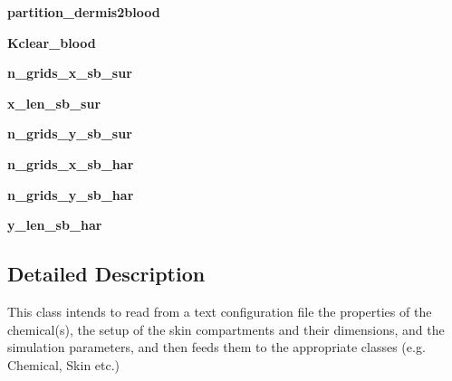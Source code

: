 \begin{DoxyCompactItemize}
\item 
{\bfseries partition\+\_\+dermis2blood}\hypertarget{classconfig_1_1Config_adcc85eeec903a32b7ad7e0cc7c91db7c}{}\label{classconfig_1_1Config_adcc85eeec903a32b7ad7e0cc7c91db7c}

\item 
{\bfseries Kclear\+\_\+blood}\hypertarget{classconfig_1_1Config_aa3a1b7ad53c1feddae7699e7523a1f60}{}\label{classconfig_1_1Config_aa3a1b7ad53c1feddae7699e7523a1f60}

\item 
{\bfseries n\+\_\+grids\+\_\+x\+\_\+sb\+\_\+sur}\hypertarget{classconfig_1_1Config_a3fd75b9b7988b6be6898c64bdd51622b}{}\label{classconfig_1_1Config_a3fd75b9b7988b6be6898c64bdd51622b}

\item 
{\bfseries x\+\_\+len\+\_\+sb\+\_\+sur}\hypertarget{classconfig_1_1Config_a60297bcee7cfe8db8df0e3b92a39f417}{}\label{classconfig_1_1Config_a60297bcee7cfe8db8df0e3b92a39f417}

\item 
{\bfseries n\+\_\+grids\+\_\+y\+\_\+sb\+\_\+sur}\hypertarget{classconfig_1_1Config_a2d2f6d431372cb74cb17cb9643f4d0fb}{}\label{classconfig_1_1Config_a2d2f6d431372cb74cb17cb9643f4d0fb}

\item 
{\bfseries n\+\_\+grids\+\_\+x\+\_\+sb\+\_\+har}\hypertarget{classconfig_1_1Config_ac087529074e99d66b363aa18375d0b70}{}\label{classconfig_1_1Config_ac087529074e99d66b363aa18375d0b70}

\item 
{\bfseries n\+\_\+grids\+\_\+y\+\_\+sb\+\_\+har}\hypertarget{classconfig_1_1Config_a96a15e28405d9676b1afe7286ab54ac7}{}\label{classconfig_1_1Config_a96a15e28405d9676b1afe7286ab54ac7}

\item 
{\bfseries y\+\_\+len\+\_\+sb\+\_\+har}\hypertarget{classconfig_1_1Config_a0a8c011521124123f0a38606ee8452b3}{}\label{classconfig_1_1Config_a0a8c011521124123f0a38606ee8452b3}

\end{DoxyCompactItemize}


\subsection{Detailed Description}
\begin{DoxyVerb}This class intends to read from a text configuration
file the properties of the chemical(s), the setup of the skin compartments 
and their dimensions, and the simulation parameters,
and then feeds them to the appropriate classes (e.g. Chemical, Skin etc.)
\end{DoxyVerb}
 

